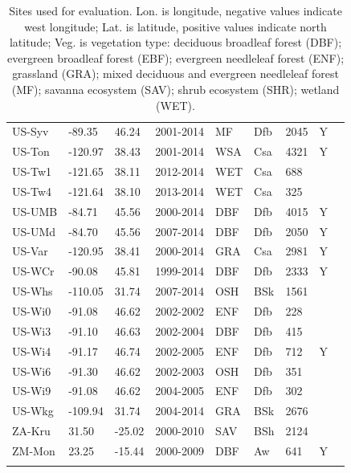\documentclass{myreport}
\begin{document}
\begin{longtable}{lllllllll}
  US-Syv & -89.35 & 46.24 & 2001-2014 & MF & Dfb & 2045 & Y & \citet{US-Syv} \\ 
  US-Ton & -120.97 & 38.43 & 2001-2014 & WSA & Csa & 4321 & Y & \citet{US-Ton} \\ 
  US-Tw1 & -121.65 & 38.11 & 2012-2014 & WET & Csa & 688 &  & \citet{US-Tw1} \\ 
  US-Tw4 & -121.64 & 38.10 & 2013-2014 & WET & Csa & 325 &  & \citet{US-Tw4} \\ 
  US-UMB & -84.71 & 45.56 & 2000-2014 & DBF & Dfb & 4015 & Y & \citet{US-UMB} \\ 
  US-UMd & -84.70 & 45.56 & 2007-2014 & DBF & Dfb & 2050 & Y & \citet{US-UMd} \\ 
  US-Var & -120.95 & 38.41 & 2000-2014 & GRA & Csa & 2981 & Y & \citet{US-Var} \\ 
  US-WCr & -90.08 & 45.81 & 1999-2014 & DBF & Dfb & 2333 & Y & \citet{US-WCr} \\ 
  US-Whs & -110.05 & 31.74 & 2007-2014 & OSH & BSk & 1561 &  & \citet{US-Whs} \\ 
  US-Wi0 & -91.08 & 46.62 & 2002-2002 & ENF & Dfb & 228 &  & \citet{US-Wi0} \\ 
  US-Wi3 & -91.10 & 46.63 & 2002-2004 & DBF & Dfb & 415 &  & \citet{US-Wi3} \\ 
  US-Wi4 & -91.17 & 46.74 & 2002-2005 & ENF & Dfb & 712 & Y & \citet{US-Wi4} \\ 
  US-Wi6 & -91.30 & 46.62 & 2002-2003 & OSH & Dfb & 351 &  & \citet{US-Wi6} \\ 
  US-Wi9 & -91.08 & 46.62 & 2004-2005 & ENF & Dfb & 302 &  & \citet{US-Wi9} \\ 
  US-Wkg & -109.94 & 31.74 & 2004-2014 & GRA & BSk & 2676 &  & \citet{US-Wkg} \\ 
  ZA-Kru & 31.50 & -25.02 & 2000-2010 & SAV & BSh & 2124 &  & \citet{ZA-Kru} \\ 
  ZM-Mon & 23.25 & -15.44 & 2000-2009 & DBF & Aw & 641 & Y & \citet{ZM-Mon} \\ 
  \bottomrule
\caption{Sites used for evaluation. Lon. is longitude, negative values indicate west longitude; Lat. is latitude, positive values indicate north latitude; Veg. is vegetation type: deciduous broadleaf forest (DBF); evergreen broadleaf forest (EBF); evergreen needleleaf forest (ENF); grassland (GRA); mixed deciduous and evergreen needleleaf forest (MF); savanna ecosystem (SAV); shrub ecosystem (SHR); wetland (WET).} 
\label{tab:sites}
\end{longtable}
\end{document}
